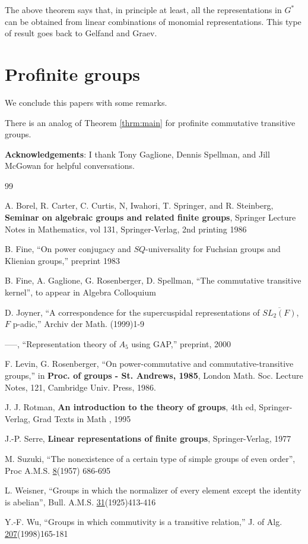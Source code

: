 \documentclass[amsfonts,12pt]{article}
\begin{document}
The above theorem says that, in principle at least, all the 
representations in $G^*$ can be obtained from linear combinations of 
monomial representations. This type of result goes back to 
Gelfand and Graev.

\section{Profinite groups}

We conclude this papers with some remarks.

There is an analog of 
Theorem \ref{thrm:main} for profinite commutative 
transitive groups.

{\bf Acknowledgements}:
I thank Tony Gaglione, Dennis Spellman, and Jill McGowan 
for helpful conversations.

\begin{thebibliography}{99}  

 A. Borel, R. Carter, C. Curtis, N, Iwahori, 
T. Springer, and R. Steinberg, {\bf Seminar on algebraic
groups and related finite groups},  Springer
Lecture Notes in Mathematics, vol 131, Springer-Verlag,
2nd printing 1986

 B. Fine, ``On power conjugacy and $SQ$-universality 
for Fuchsian groups and Klienian groups,'' preprint 1983

 B. Fine, A. Gaglione,
G. Rosenberger, D. Spellman, ``The commutative transitive kernel'',
to appear in Algebra Colloquium

 D. Joyner, ``A correspondence for the supercuspidal
representations of $\overline{SL_2(F)}$, $F$ p-adic,'' 
Archiv der Math. (1999)1-9

 -----, ``Representation theory of $A_5$ using GAP,''
preprint, 2000

 F. Levin, G. Rosenberger, ``On power-commutative
and commutative-transitive groups,'' in
{\bf Proc. of groups - St. Andrews, 1985},
London Math. Soc. Lecture Notes, 121, Cambridge Univ.
Press, 1986.

 J. J. Rotman, {\bf An introduction to the
theory of groups}, 4th ed, Springer-Verlag, Grad Texts in Math 
, 1995

 J.-P. Serre, 
{\bf Linear representations of finite groups},
Springer-Verlag, 1977

 M. Suzuki, ``The nonexistence of a certain type of
simple groups of even order'', Proc A.M.S. \underline{8}(1957)
686-695

 L. Weisner, ``Groups in which the normalizer of 
every element except the identity is abelian'', Bull. A.M.S. 
\underline{31}(1925)413-416

 Y.-F. Wu, ``Groups in which commutivity is a
transitive relation,'' J. of Alg. \underline{207}(1998)165-181
\end{thebibliography}
\end{document}
